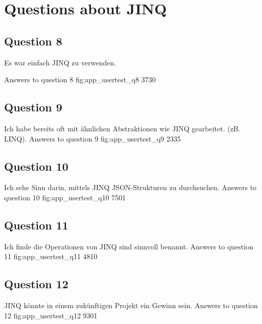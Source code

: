 \section{Questions about JINQ} %
\label{sec:Questions about JINQ}

\subsection*{Question 8}
\label{sub:ut_q8}
Es war einfach JINQ zu verwenden.

\likertbarchart
  {Answers to question 8}
  {fig:app_usertest_q8}
  {3}{7}{3}{0}

\subsection*{Question 9}
\label{sub:ut_q9}
Ich habe bereits oft mit ähnlichen Abstraktionen wie JINQ gearbeitet. (zB.
LINQ).
\likertbarchart
  {Answers to question 9}
  {fig:app_usertest_q9}
  {2}{3}{3}{5}

\subsection*{Question 10}
\label{sub:ut_q10}
Ich sehe Sinn darin, mittels JINQ JSON-Strukturen zu durchsuchen. 
\likertbarchart
  {Answers to question 10}
  {fig:app_usertest_q10}
  {7}{5}{0}{1}

\subsection*{Question 11}
\label{sub:ut_q11}
Ich finde die Operationen von JINQ sind sinnvoll benannt.
\likertbarchart
  {Answers to question 11}
  {fig:app_usertest_q11}
  {4}{8}{1}{0}
  
\subsection*{Question 12}
\label{sub:ut_q12}
JINQ könnte in einem zukünftigen Projekt ein Gewinn sein.
\likertbarchart
  {Answers to question 12}
  {fig:app_usertest_q12}
  {9}{3}{0}{1}

